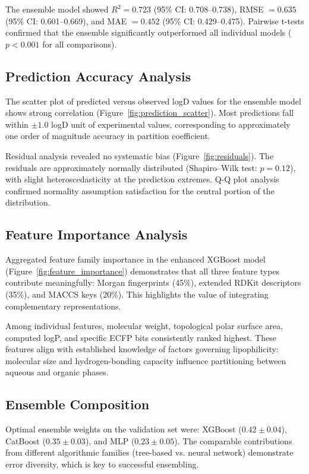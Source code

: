 \documentclass[12pt,a4paper]{article}
\begin{document}
The ensemble model showed $R^2 = 0.723$ (95\% CI: 0.708--0.738), RMSE $= 0.635$ (95\% CI: 0.601--0.669), and MAE $= 0.452$ (95\% CI: 0.429--0.475). Pairwise t-tests confirmed that the ensemble significantly outperformed all individual models ($p < 0.001$ for all comparisons).

\subsection{Prediction Accuracy Analysis}

The scatter plot of predicted versus observed logD values for the ensemble model shows strong correlation (Figure~\ref{fig:prediction_scatter}). Most predictions fall within $\pm 1.0$ logD unit of experimental values, corresponding to approximately one order of magnitude accuracy in partition coefficient.

Residual analysis revealed no systematic bias (Figure~\ref{fig:residuals}). The residuals are approximately normally distributed (Shapiro--Wilk test: $p = 0.12$), with slight heteroscedasticity at the prediction extremes. Q-Q plot analysis confirmed normality assumption satisfaction for the central portion of the distribution.

\subsection{Feature Importance Analysis}

Aggregated feature family importance in the enhanced XGBoost model (Figure~\ref{fig:feature_importance}) demonstrates that all three feature types contribute meaningfully: Morgan fingerprints (45\%), extended RDKit descriptors (35\%), and MACCS keys (20\%). This highlights the value of integrating complementary representations.

Among individual features, molecular weight, topological polar surface area, computed logP, and specific ECFP bits consistently ranked highest. These features align with established knowledge of factors governing lipophilicity: molecular size and hydrogen-bonding capacity influence partitioning between aqueous and organic phases.

\subsection{Ensemble Composition}

Optimal ensemble weights on the validation set were: XGBoost ($0.42 \pm 0.04$), CatBoost ($0.35 \pm 0.03$), and MLP ($0.23 \pm 0.05$). The comparable contributions from different algorithmic families (tree-based vs. neural network) demonstrate error diversity, which is key to successful ensembling.
\end{document}
